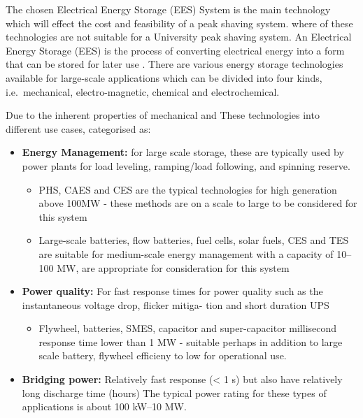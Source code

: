The chosen Electrical Energy Storage (EES) System is the main technology
which will effect the cost and feasibility of a peak shaving system.
where of these technologies are not suitable for a University peak
shaving system. An Electrical Energy Storage (EES) is the process of
converting electrical energy into a form that can be stored for later
use \cite{Chen2009291}. There are various energy storage technologies
available for large-scale applications which can be divided into four
kinds, i.e.~mechanical, electro-magnetic, chemical and electrochemical.

Due to the inherent properties of mechanical and These technologies into
different use cases, categorised as:

\begin{itemize}
\tightlist
\item
  \textbf{Energy Management:} for large scale storage, these are
  typically used by power plants for load leveling, ramping/load
  following, and spinning reserve.

  \begin{itemize}
  \tightlist
  \item
    PHS, CAES and CES are the typical technologies for high generation
    above 100MW - these methods are on a scale to large to be considered
    for this system
  \item
    Large-scale batteries, flow batteries, fuel cells, solar fuels, CES
    and TES are suitable for medium-scale energy management with a
    capacity of 10--100 MW, are appropriate for consideration for this
    system
  \end{itemize}
\item
  \textbf{Power quality:} For fast response times for power quality such
  as the instantaneous voltage drop, flicker mitiga- tion and short
  duration UPS

  \begin{itemize}
  \tightlist
  \item
    Flywheel, batteries, SMES, capacitor and super-capacitor millisecond
    response time lower than 1 MW - suitable perhaps in addition to
    large scale battery, flywheel efficieny to low for operational use.
  \end{itemize}
\item
  \textbf{Bridging power:} Relatively fast response (\textless{} 1 s)
  but also have relatively long discharge time (hours) The typical power
  rating for these types of applications is about 100 kW--10 MW.


\end{itemize}
